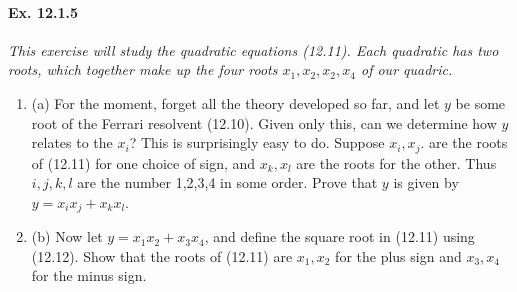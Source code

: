 \documentclass[11pt,a4paper]{article}
\newcommand{\be} {\begin{enumerate}}
\newcommand{\ee} {\end{enumerate}}
\begin{document}
\paragraph{Ex. 12.1.5}

{\it This exercise will study the quadratic equations (12.11). Each quadratic has two roots, which together make up the four roots $x_1,x_2,x_2,x_4$ of our quadric.
\be
\item[(a)] For the moment, forget all the theory developed so far, and let $y$ be some root of the Ferrari resolvent (12.10). Given only this, can we determine how $y$ relates to the $x_i$? This is surprisingly easy to do. Suppose $x_i,x_j$. are the roots of (12.11) for one choice of sign, and $x_k,x_l$ are the roots for the other. Thus $i,j,k,l$ are the number 1,2,3,4 in some order. Prove that $y$ is given by $y=x_ix_j + x_kx_l$.

\item[(b)] Now let $y = x_1x_2 +x_3x_4$, and define the square root in (12.11) using (12.12). Show that the roots of (12.11) are $x_1,x_2$ for the plus sign and $x_3,x_4$ for the minus sign.
\ee
}
\end{document}
